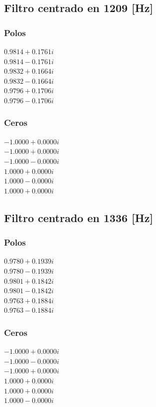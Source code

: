 \subsection*{Filtro centrado en 1209 [Hz]}
\begin{multicols}{2}
  \subsubsection*{Polos}
  $0.9814 + 0.1761i$\\
  $0.9814 - 0.1761i$\\
  $0.9832 + 0.1664i$\\
  $0.9832 - 0.1664i$\\
  $0.9796 + 0.1706i$\\
  $0.9796 - 0.1706i$\\

  \columnbreak
  \subsubsection*{Ceros}
  $-1.0000 + 0.0000i$\\
  $-1.0000 + 0.0000i$\\
  $-1.0000 - 0.0000i$\\
  $1.0000 + 0.0000i$\\
  $1.0000 - 0.0000i$\\
  $1.0000 + 0.0000i$\\
\end{multicols}

\subsection*{Filtro centrado en 1336 [Hz]}
\begin{multicols}{2}
  \subsubsection*{Polos}
  $0.9780 + 0.1939i$\\
  $0.9780 - 0.1939i$\\
  $0.9801 + 0.1842i$\\
  $0.9801 - 0.1842i$\\
  $0.9763 + 0.1884i$\\
  $0.9763 - 0.1884i$\\

  \columnbreak
  \subsubsection*{Ceros}
  $-1.0000 + 0.0000i$\\
  $-1.0000 - 0.0000i$\\
  $-1.0000 + 0.0000i$\\
  $1.0000 + 0.0000i$\\
  $1.0000 + 0.0000i$\\
  $1.0000 - 0.0000i$\\
\end{multicols}

